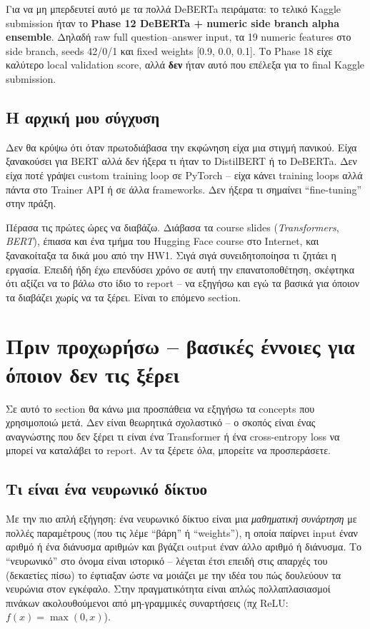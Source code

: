 \documentclass[12pt]{fphw}
\begin{document}
Για να μη μπερδευτεί αυτό με τα πολλά DeBERTa πειράματα: το τελικό Kaggle submission ήταν το \textbf{Phase 12 DeBERTa + numeric side branch alpha ensemble}. Δηλαδή raw full question--answer input, τα 19 numeric features στο side branch, seeds 42/0/1 και fixed weights [0.9, 0.0, 0.1]. Το Phase 18 είχε καλύτερο local validation score, αλλά \textbf{δεν} ήταν αυτό που επέλεξα για το final Kaggle submission.

\subsection{Η αρχική μου σύγχυση}

Δεν θα κρύψω ότι όταν πρωτοδιάβασα την εκφώνηση είχα μια στιγμή πανικού. Είχα ξανακούσει για BERT αλλά δεν ήξερα τι ήταν το DistilBERT ή το DeBERTa. Δεν είχα ποτέ γράψει custom training loop σε PyTorch -- είχα κάνει training loops αλλά πάντα στο Trainer API ή σε άλλα frameworks. Δεν ήξερα τι σημαίνει ``fine-tuning'' στην πράξη.

Πέρασα τις πρώτες ώρες να διαβάζω. Διάβασα τα course slides (\emph{Transformers}, \emph{BERT}), έπιασα και ένα τμήμα του Hugging Face course στο Internet, και ξανακοίταξα τα δικά μου από την HW1. Σιγά σιγά συνειδητοποίησα τι ζητάει η εργασία. Επειδή ήδη έχω επενδύσει χρόνο σε αυτή την επανατοποθέτηση, σκέφτηκα ότι αξίζει να το βάλω στο ίδιο το report -- να εξηγήσω και εγώ τα βασικά για όποιον τα διαβάζει χωρίς να τα ξέρει. Είναι το επόμενο section.

\section{Πριν προχωρήσω -- βασικές έννοιες για όποιον δεν τις ξέρει}

Σε αυτό το section θα κάνω μια προσπάθεια να εξηγήσω τα concepts που χρησιμοποιώ μετά. Δεν είναι θεωρητικά σχολαστικό -- ο σκοπός είναι ένας αναγνώστης που δεν ξέρει τι είναι ένα Transformer ή ένα cross-entropy loss να μπορεί να καταλάβει το report. Αν τα ξέρετε όλα, μπορείτε να προσπεράσετε.

\subsection{Τι είναι ένα νευρωνικό δίκτυο}

Με την πιο απλή εξήγηση: ένα νευρωνικό δίκτυο είναι μια \emph{μαθηματική συνάρτηση} με πολλές παραμέτρους (που τις λέμε ``βάρη'' ή ``weights''), η οποία παίρνει input έναν αριθμό ή ένα διάνυσμα αριθμών και βγάζει output έναν άλλο αριθμό ή διάνυσμα. Το ``νευρωνικό'' στο όνομα είναι ιστορικό -- λέγεται έτσι επειδή στις απαρχές του (δεκαετίες πίσω) το έφτιαξαν ώστε να μοιάζει με την ιδέα του πώς δουλεύουν τα νευρώνια στον εγκέφαλο. Στην πραγματικότητα είναι απλώς πολλαπλασιασμοί πινάκων ακολουθούμενοι από μη-γραμμικές συναρτήσεις (πχ ReLU: $f(x) = \max(0, x)$).
\end{document}

